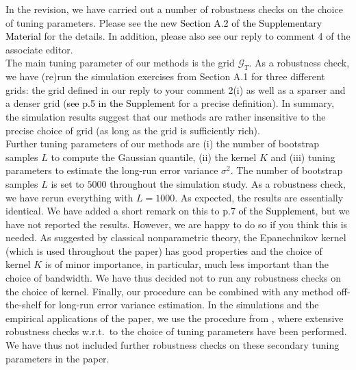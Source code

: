 \documentclass[a4paper,12pt]{article}
\newcommand{\reference}[1]{\textcolor{black}{#1}}
\begin{document}
\begin{enumerate}[label=\arabic*.,leftmargin=0.6cm]
In the revision, we have carried out a number of robustness checks on the choice of tuning parameters. Please see the new \reference{Section A.2 of the Supplementary Material} for the details. In addition, please also see our reply to comment 4 of the associate editor. \\
The main tuning parameter of our methods is the grid $\mathcal{G}_T$. As a robustness check, we have (re)run the simulation exercises from Section A.1 for three different grids: the grid defined in our reply to your comment 2(i) as well as a sparser and a denser grid (\reference{see p.5 in the Supplement} for a precise definition).
In summary, the simulation results suggest that our methods are rather insensitive to the precise choice of grid (as long as the grid is sufficiently rich). \\
Further tuning parameters of our methods are (i) the number of bootstrap samples $L$ to compute the Gaussian quantile, (ii) the kernel $K$ and (iii) tuning parameters to estimate the long-run error variance $\sigma^2$. 
The number of bootstrap samples $L$ is set to $5000$ throughout the simulation study. As a robustness check, we have rerun everything with $L=1000$. As expected, the results are essentially identical. We have added a short remark on this to \reference{p.7 of the Supplement}, but we have not reported the results. However, we are happy to do so if you think this is needed.
As suggested by classical nonparametric theory, the Epanechnikov kernel (which is used throughout the paper) has good properties and the choice of kernel $K$ is of minor importance, in particular, much less important than the choice of bandwidth. We have thus decided not to run any robustness checks on the choice of kernel. 
Finally, our procedure can be combined with any method off-the-shelf for long-run error variance estimation. In the simulations and the empirical applications of the paper, we use the procedure from \cite{KhismatullinaVogt2020}, where extensive robustness checks w.r.t.\ to the choice of tuning parameters have been performed. We have thus not included further robustness checks on these secondary tuning parameters in the paper.


\end{enumerate}
\end{document}
